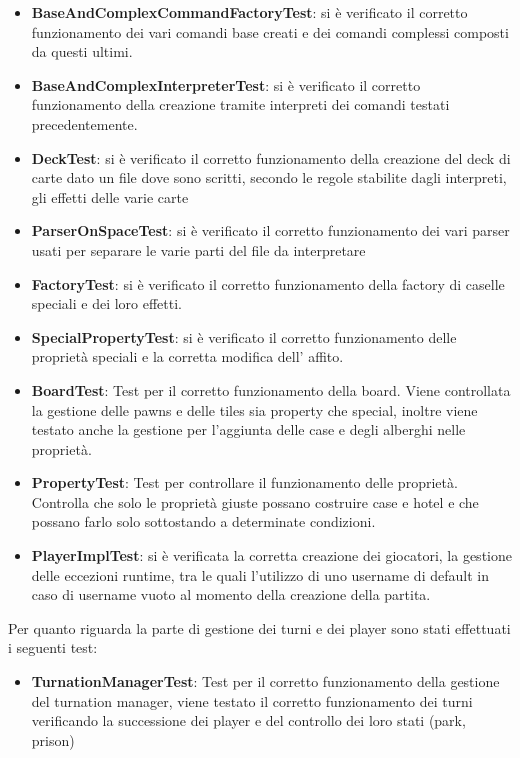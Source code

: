 \begin{itemize}
    \item \textbf{BaseAndComplexCommandFactoryTest}: si è verificato il corretto funzionamento dei vari comandi base creati e dei comandi complessi composti da questi ultimi.
    \item \textbf{BaseAndComplexInterpreterTest}: si è verificato il corretto funzionamento della creazione tramite interpreti dei comandi testati precedentemente.
    \item \textbf{DeckTest}: si è verificato il corretto funzionamento della creazione del deck di carte dato un file dove sono scritti, secondo le regole stabilite dagli interpreti, gli effetti delle varie carte
    \item \textbf{ParserOnSpaceTest}: si è verificato il corretto funzionamento dei vari parser usati per separare le varie parti del file da interpretare
    \item \textbf{FactoryTest}: si è verificato il corretto funzionamento della factory di caselle speciali e dei loro effetti. 
    \item \textbf{SpecialPropertyTest}: si è verificato il corretto funzionamento delle proprietà speciali e la corretta modifica dell' affito.
    \item \textbf{BoardTest}: Test per il corretto funzionamento della board. Viene controllata la gestione delle pawns e delle tiles sia property che special, inoltre viene testato anche la gestione per l'aggiunta delle case e degli alberghi nelle proprietà.
    \item \textbf{PropertyTest}: Test per controllare il funzionamento delle proprietà. Controlla che solo le proprietà giuste possano costruire case e hotel e che possano farlo solo sottostando a determinate condizioni.
    \item \textbf{PlayerImplTest}: si è verificata la corretta creazione dei giocatori, la gestione delle eccezioni runtime, tra le quali l'utilizzo di uno username di default in caso di username vuoto al momento della creazione della partita.
\end{itemize}
Per quanto riguarda la parte di gestione dei turni e dei player sono stati effettuati i seguenti test:\newline
\begin{itemize}
    \item \textbf{TurnationManagerTest}: Test per il corretto funzionamento della gestione del turnation manager, viene testato il corretto funzionamento dei turni verificando la successione dei player e del controllo dei loro stati (park, prison)
\end{itemize}

